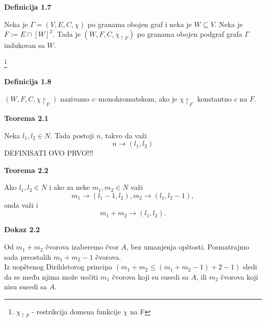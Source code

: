 \documentclass[12pt,a4paper]{article}
\newcommand\blfootnote[1]{%
  \begingroup
  \renewcommand\thefootnote{}\footnote{#1}%
  \addtocounter{footnote}{-1}%
  \endgroup
}
\begin{document}
	\begin{mdframed}

	{\noindent\fontsize{12pt}{12pt}\textbf{Definicija 1.7}}
	\vspace{0.5em}

	\noindent Neka je $\Gamma = (V, E, C, \chi)$ po granama obojen graf i neka je $W \subseteq V$. 
	Neka je $F := E \cap [W]^{2}$.
	Tada je $(W , F, C, \chi_{\upharpoonright F})$  po granama obojen podgraf grafa $\Gamma$ indukovan sa $W$.
	\end{mdframed}
	\vspace{0.5em}

\blfootnote{$ \chi_{\upharpoonright F}$ - restrikcija domena funkcije $\chi$ na F}

	\begin{mdframed}
	{\noindent\fontsize{12pt}{12pt}\textbf{Definicija 1.8}}
	\vspace{0.5em}

	\noindent 	$(W , F, C, \chi\upharpoonright_{F})$ nazivamo $c$–monohromatskom, ako je $\chi\upharpoonright_{F}$ konstantno $c$ na $F$.
	\end{mdframed}
	\vspace{0.5em}


	

	{\noindent\fontsize{12pt}{12pt}\textbf{Teorema 2.1}}
	\vspace{0.5em}

	\noindent	Neka $l_{1}, l_{2} \in N$. Tada postoji $n$, takvo da važi
	\[n \rightarrow (l_{1}, l_{2})\] DEFINISATI OVO PRVO!!!
	\vspace{1.5em}\

	{\noindent\fontsize{12pt}{12pt}\textbf{Teorema 2.2}}
	\vspace{0.5em}

	\noindent	Ako $l_{1}, l_{2} \in N$ i ako za neke $m_{1}, m_{2} \in N$ važi	
	\[m_{1} \rightarrow (l_{1}-1, l_{2}), m_{2} \rightarrow (l_{1}, l_{2}-1) ,\]
	onda važi i
	\[m_{1} + m_{2} \rightarrow (l_{1}, l_{2}).\]
	\vspace{1.5em}

	{\noindent\fontsize{12pt}{12pt}\textbf{Dokaz 2.2}}
	\vspace{0.5em}

	\noindent	Od $m_{1}+m_{2}$ čvorova izaberemo čvor $A$, bez umanjenja opštosti. Posmatrajmo sada preostalih $m_1+m_2-1$ čvorova.\\ Iz uopštenog Dirihletovog principa $(m_{1}+m_{2} \leq (m_{1}+m_{2}-1)+2-1)$ sledi da se
	među njima može uočiti $m_1$ čvorova koji su susedi sa $A$, ili $m_2$ čvorova koji nisu susedi sa $A$.\\
	
\end{document}
